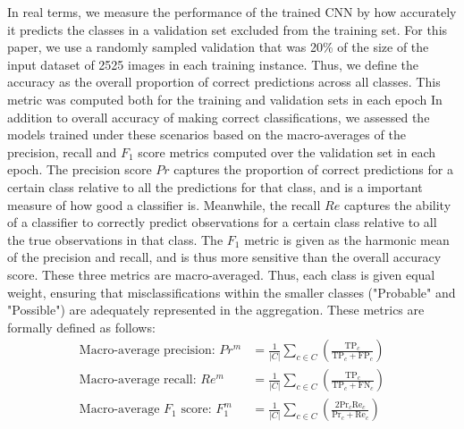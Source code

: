 \documentclass[Journal,letterpaper, SingleSpace, InsideFigs]{ascelike-new}
\begin{document}
In real terms, we measure the performance of the trained CNN by how accurately it predicts the classes in a validation set excluded from the training set. For this paper, we use a randomly sampled validation that was 20\% of the size of the input dataset of 2525 images in each training instance.
Thus, we define the accuracy as the overall proportion of correct predictions across all classes.
This metric was computed both for the training and validation sets in each epoch
In addition to overall accuracy of making correct classifications, we assessed the models trained under these scenarios based on the macro-averages of the precision, recall and $F_1$ score metrics computed over the validation set in each epoch. The precision score $Pr$ captures the proportion of correct predictions for a certain class relative to all the predictions for that class, and is a important measure of how good a classifier is. Meanwhile, the recall $Re$ captures the ability of a classifier to correctly predict observations for a certain class relative to all the true observations in that class. The $F_1$ metric is given as the harmonic mean of the precision and recall, and is thus more sensitive than the overall accuracy score. These three metrics are macro-averaged. Thus, each class is given equal weight, ensuring that misclassifications within the smaller classes ("Probable" and "Possible") are adequately represented in the aggregation. These metrics are formally defined as follows:
\begin{align}
\text{Macro-average precision: }    Pr^m &= \frac{1}{|C|}\sum_{c\in C} \left(  \frac{ \mathrm{TP}_{c} }{\mathrm{TP}_{c} + \mathrm{FP}_c}\right) \\
\text{Macro-average recall: }    Re^m &= \frac{1}{|C|} \sum_{c\in C} \left(  \frac{ \mathrm{TP}_{c} }{\mathrm{TP}_{c} + \mathrm{FN}_c}\right) \\
\text{Macro-average $F_1$ score: }    F_1^m &= \frac{1}{|C|} \sum_{c\in C} \left(  \frac{2  \mathrm{Pr}_{c} \mathrm{Re}_{c}}{\mathrm{Pr}_{c} + \mathrm{Re}_c}\right)
\end{align}
\end{document}
